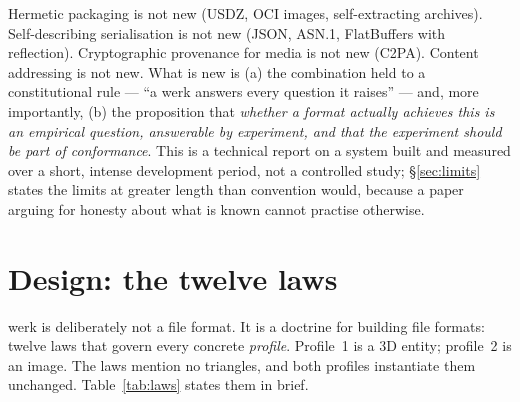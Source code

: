 \documentclass[10pt,twocolumn,letterpaper]{article}
\begin{document}
Hermetic packaging is not new (USDZ, OCI images, self-extracting archives).
Self-describing serialisation is not new (JSON, ASN.1, FlatBuffers with reflection).
Cryptographic provenance for media is not new (C2PA). Content addressing is not
new. What is new is (a) the combination held to a constitutional rule --- ``a
werk answers every question it raises'' --- and, more importantly, (b) the
proposition that \emph{whether a format actually achieves this is an empirical
question, answerable by experiment, and that the experiment should be part of
conformance}. This is a technical report on a system built and measured over a
short, intense development period, not a controlled study; \S\ref{sec:limits}
states the limits at greater length than convention would, because a paper
arguing for honesty about what is known cannot practise otherwise.

\section{Design: the twelve laws}

werk is deliberately not a file format. It is a doctrine for building file
formats: twelve laws that govern every concrete \emph{profile}. Profile~1 is a
3D entity; profile~2 is an image. The laws mention no triangles, and both
profiles instantiate them unchanged. Table~\ref{tab:laws} states them in brief.
\end{document}
